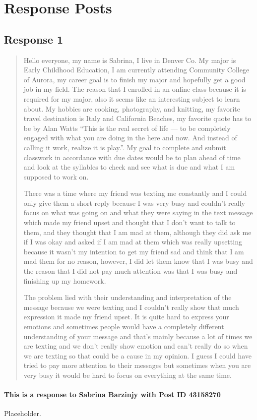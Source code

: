 
\section{Response Posts}
  \subsection{Response 1}
    \begin{quotation}
      Hello everyone, my name is Sabrina, I live in Denver Co. My major is Early
        Childhood Education, I am currently attending Community College of
        Aurora, my career goal is to finish my major and hopefully get a good
        job in my field. The reason that I enrolled in an online class because
        it is required for my major, also it seems like an interesting subject
        to learn about. My hobbies are cooking, photography, and knitting, my
        favorite travel destination is Italy and California Beaches, my
        favorite quote has to be by Alan Watts “This is the real secret of life
        --- to be completely engaged with what you are doing in the here and
        now. And instead of calling it work, realize it is play.”. My goal to
        complete and submit classwork in accordance with due dates would be to
        plan ahead of time and look at the syllables to check and see what is
        due and what I am supposed to work on.

      There was a time where my friend was texting me constantly and I could
        only give them a short reply because I was very busy and couldn’t really
        focus on what was going on and what they were saying in the text message
        which made my friend upset and thought that I don’t want to talk to
        them, and they thought that I am mad at them, although they did ask me
        if I was okay and asked if I am mad at them which was really upsetting
        because it wasn’t my intention to get my friend sad and think that I am
        mad them for no reason, however, I did let them know that I was busy and
        the reason that I did not pay much attention was that I was busy and
        finishing up my homework.

      The problem lied with their understanding and interpretation of the
        message because we were texting and I couldn’t really show that much
        expression it made my friend upset. It is quite hard to express your
        emotions and sometimes people would have a completely different
        understanding of your message and that’s mainly because a lot of times
        we are texting and we don’t really show emotion and can’t really do so
        when we are texting so that could be a cause in my opinion. I guess I
        could have tried to pay more attention to their messages but sometimes
        when you are very busy it would be hard to focus on everything at the
        same time.
    \end{quotation}

    \paragraph{This is a response to Sabrina Barzinjy with Post ID 43158270}
      Placeholder.
